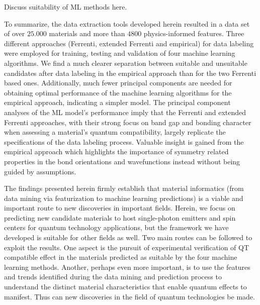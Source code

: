 \documentclass[superscriptaddress,unsortedaddress,
 amsmath,amssymb,
 aps,
]{revtex4-2}
\begin{document}
Discuss suitability of ML methods here. 

To summarize, the data extraction tools developed herein resulted in a data set of over $25.000$ materials and more than $4800$ physics-informed features. Three different approaches (Ferrenti, extended Ferrenti and empirical) for data labeling were employed for training, testing and validation of four machine learning algorithms. 
We find a much clearer separation between suitable and unsuitable candidates after data labeling in the empirical approach than for the two Ferrenti based ones. 
Additionally, much fewer principal components are needed for obtaining optimal performance of the machine learning algorithms for the empirical approach, indicating a simpler model. 
The principal component analyses of the ML model's performance imply that the Ferrenti and extended Ferrenti approaches, with their strong focus on band gap and bonding character when assessing a material's quantum compatibility, largely replicate the specifications of the data labeling process. 
Valuable insight is gained from the empirical approach which highlights the importance of symmetry related properties in the bond orientations and wavefunctions instead without being guided by assumptions. 

The findings presented herein firmly establish that material informatics (from data mining via featurization to machine learning predictions) is a viable and important route to new discoveries in important fields.  Herein, we focus on predicting new candidate materials to host single-photon emitters and spin centers for quantum technology applications, but the framework we have developed is suitable for other fields as well. 
Two main routes can be followed to exploit the results. One aspect is the pursuit of experimental verification of QT compatible effect in the materials predicted as suitable by the four machine learning methods. Another, perhaps even more important, is to use the features and trends identified during the data mining and prediction process to understand the distinct material characteristics that enable quantum effects to manifest. Thus can new discoveries in the field of quantum technologies be made. 
\end{document}
